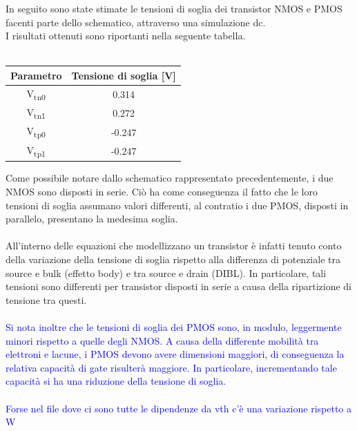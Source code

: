 \documentclass[11pt,  english, makeidx, a4paper, titlepage, oneside]{book}
\begin{document}
In seguito sono state stimate le tensioni di soglia dei transistor NMOS e PMOS facenti parte dello schematico, attraverso una simulazione dc.
\\
I risultati ottenuti sono riportanti nella seguente tabella.
\\\\
\begin{center}
	\begin{tabular}{|c|c|}
	\hline
	Parametro & Tensione di soglia [V] \\
	\hline
	 V\textsubscript{tn0} & 0.314\\
	\hline
	 V\textsubscript{tn1} & 0.272 \\
	\hline
	V\textsubscript{tp0} & -0.247 \\
	\hline
	V\textsubscript{tp1} & -0.247 \\
	\hline
	\end{tabular}	
\end{center}
\vspace{0.3cm}
Come possibile notare dallo schematico rappresentato precedentemente, i due NMOS sono disposti in serie. Ciò ha come conseguenza il fatto che le loro tensioni di soglia assumano valori differenti, al contratio i due PMOS, disposti in parallelo, presentano la medesima soglia.
\\\\
All'interno delle equazioni che modellizzano un transistor è infatti tenuto conto della variazione della tensione di soglia rispetto alla differenza di potenziale tra source e bulk (effetto body) e tra source e drain (DIBL). In particolare, tali tensioni sono differenti per transistor disposti in serie a causa della ripartizione di tensione tra questi.
\\\\
\textcolor{blue}{Si nota inoltre che le tensioni di soglia dei PMOS sono, in modulo, leggermente minori rispetto a quelle degli NMOS. A causa della differente mobilità tra elettroni e lacune, i PMOS devono avere dimensioni maggiori, di conseguenza la relativa capacità di gate risulterà maggiore. In particolare, incrementando tale capacità si ha una riduzione della tensione di soglia.
\\\\
Forse nel file dove ci sono tutte le dipendenze da vth c'è una variazione rispetto a W}
\\\\
\end{document}
